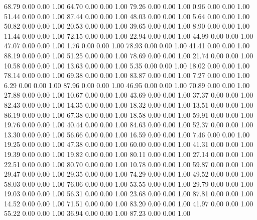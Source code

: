    68.79   0.00   0.00   1.00
   64.70   0.00   0.00   1.00
   79.26   0.00   0.00   1.00
    0.96   0.00   0.00   1.00
   51.44   0.00   0.00   1.00
   87.44   0.00   0.00   1.00
   48.03   0.00   0.00   1.00
    5.64   0.00   0.00   1.00
   50.82   0.00   0.00   1.00
   20.53   0.00   0.00   1.00
   39.65   0.00   0.00   1.00
    8.90   0.00   0.00   1.00
   11.44   0.00   0.00   1.00
   72.15   0.00   0.00   1.00
   22.94   0.00   0.00   1.00
   44.99   0.00   0.00   1.00
   47.07   0.00   0.00   1.00
    1.76   0.00   0.00   1.00
   78.93   0.00   0.00   1.00
   41.41   0.00   0.00   1.00
   88.19   0.00   0.00   1.00
   51.25   0.00   0.00   1.00
   78.69   0.00   0.00   1.00
   21.74   0.00   0.00   1.00
   10.58   0.00   0.00   1.00
   13.63   0.00   0.00   1.00
    5.35   0.00   0.00   1.00
   18.02   0.00   0.00   1.00
   78.14   0.00   0.00   1.00
   69.38   0.00   0.00   1.00
   83.87   0.00   0.00   1.00
    7.27   0.00   0.00   1.00
    6.29   0.00   0.00   1.00
   87.96   0.00   0.00   1.00
   46.95   0.00   0.00   1.00
   70.89   0.00   0.00   1.00
   27.88   0.00   0.00   1.00
   10.67   0.00   0.00   1.00
   43.69   0.00   0.00   1.00
   37.37   0.00   0.00   1.00
   82.43   0.00   0.00   1.00
   14.35   0.00   0.00   1.00
   18.32   0.00   0.00   1.00
   13.51   0.00   0.00   1.00
   86.19   0.00   0.00   1.00
   67.38   0.00   0.00   1.00
   18.58   0.00   0.00   1.00
   59.91   0.00   0.00   1.00
   19.76   0.00   0.00   1.00
   40.44   0.00   0.00   1.00
   84.63   0.00   0.00   1.00
   52.37   0.00   0.00   1.00
   13.30   0.00   0.00   1.00
   56.66   0.00   0.00   1.00
   16.59   0.00   0.00   1.00
    7.46   0.00   0.00   1.00
   19.25   0.00   0.00   1.00
   47.38   0.00   0.00   1.00
   60.00   0.00   0.00   1.00
   41.31   0.00   0.00   1.00
   19.39   0.00   0.00   1.00
   19.82   0.00   0.00   1.00
   80.11   0.00   0.00   1.00
   27.14   0.00   0.00   1.00
   22.51   0.00   0.00   1.00
   80.70   0.00   0.00   1.00
   10.78   0.00   0.00   1.00
   59.87   0.00   0.00   1.00
   29.47   0.00   0.00   1.00
   29.35   0.00   0.00   1.00
   74.29   0.00   0.00   1.00
   49.52   0.00   0.00   1.00
   58.03   0.00   0.00   1.00
   76.06   0.00   0.00   1.00
   53.55   0.00   0.00   1.00
   29.79   0.00   0.00   1.00
   19.03   0.00   0.00   1.00
   56.31   0.00   0.00   1.00
   23.68   0.00   0.00   1.00
   87.81   0.00   0.00   1.00
   14.52   0.00   0.00   1.00
   71.51   0.00   0.00   1.00
   83.20   0.00   0.00   1.00
   41.97   0.00   0.00   1.00
   55.22   0.00   0.00   1.00
   36.94   0.00   0.00   1.00
   87.23   0.00   0.00   1.00
